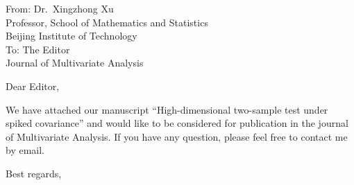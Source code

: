 \documentclass[11pt]{letter} %
\begin{document}
    \begin{letter}{From: Dr.\  Xingzhong Xu\\
        Professor, School of Mathematics and Statistics\\
        Beijing Institute of Technology\\
        \vspace{10pt}
        To: The  Editor\\
        Journal of Multivariate Analysis} 



        \signature{Xingzhong Xu\\
        Email address: xuxz@bit.edu.cn}


\opening{Dear Editor,}
We have attached our manuscript ``High-dimensional two-sample test under spiked covariance'' and would like to be considered for publication in the journal of Multivariate Analysis. If you have any question, please feel free to contact me by email.
\closing{Best regards,}
\end{letter}
\end{document}
